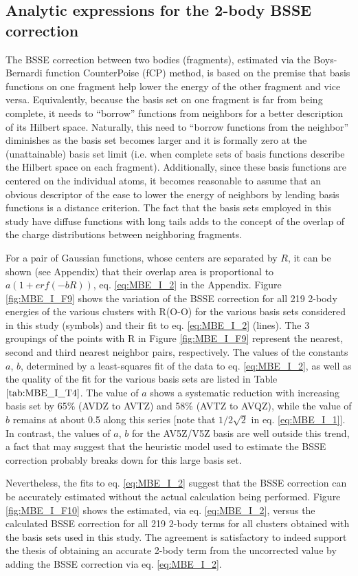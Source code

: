 \documentclass[11pt, proquest]{uwthesis}[2020/02/24]
\newcommand{\textapprox}{\raisebox{0.5ex}{\texttildelow}}
\begin{document}
\subsection{Analytic expressions for the 2-body BSSE correction}

\par The BSSE correction between two bodies (fragments), estimated via the Boys-Bernardi function CounterPoise (fCP) method,\autocite{boys_calculation_1970} is based on the premise that basis functions on one fragment help lower the energy of the other fragment and vice versa. Equivalently, because the basis set on one fragment is far from being complete, it needs to “borrow” functions from neighbors for a better description of its Hilbert space. Naturally, this need to “borrow functions from the neighbor” diminishes as the basis set becomes larger and it is formally zero at the (unattainable) basis set limit (i.e. when complete sets of basis functions describe the Hilbert space on each fragment). Additionally, since these basis functions are centered on the individual atoms, it becomes reasonable to assume that an obvious descriptor of the ease to lower the energy of neighbors by lending basis functions is a distance criterion. The fact that the basis sets employed in this study have diffuse functions with long tails adds to the concept of the overlap of the charge distributions between neighboring fragments.
\par For a pair of Gaussian functions, whose centers are separated by $R$, it can be shown (see Appendix) that their overlap area is proportional to $a(1+erf(-bR))$, eq. \eqref{eq:MBE_I_2} in the Appendix. Figure \ref{fig:MBE_I_F9} shows the variation of the BSSE correction for all 219 2-body energies of the various clusters with R(O-O) for the various basis sets considered in this study (symbols) and their fit to eq. \eqref{eq:MBE_I_2} (lines). The 3 groupings of the points with R in Figure \ref{fig:MBE_I_F9} represent the nearest, second and third nearest neighbor pairs, respectively. The values of the constants $a$, $b$, determined by a least-squares fit of the data to eq. \eqref{eq:MBE_I_2}, as well as the quality of the fit for the various basis sets are listed in Table $\ref{tab:MBE_I_T4}$. The value of $a$ shows a systematic reduction with increasing basis set by \textapprox65\% (AVDZ to AVTZ) and \textapprox58\% (AVTZ to AVQZ), while the value of $b$ remains at about 0.5 along this series [note that $1/2\sqrt{2}$ in eq. \eqref{eq:MBE_I_1}]. In contrast, the values of $a$, $b$ for the AV5Z/V5Z basis are well outside this trend, a fact that may suggest that the heuristic model used to estimate the BSSE correction probably breaks down for this large basis set.
\par Nevertheless, the fits to eq. \eqref{eq:MBE_I_2} suggest that the BSSE correction can be accurately estimated without the actual calculation being performed. Figure \ref{fig:MBE_I_F10} shows the estimated, via eq. \eqref{eq:MBE_I_2}, versus the calculated BSSE correction for all 219 2-body terms for all clusters obtained with the basis sets used in this study. The agreement is satisfactory to indeed support the thesis of obtaining an accurate 2-body term from the uncorrected value by adding the BSSE correction via eq. \eqref{eq:MBE_I_2}.
\end{document}
